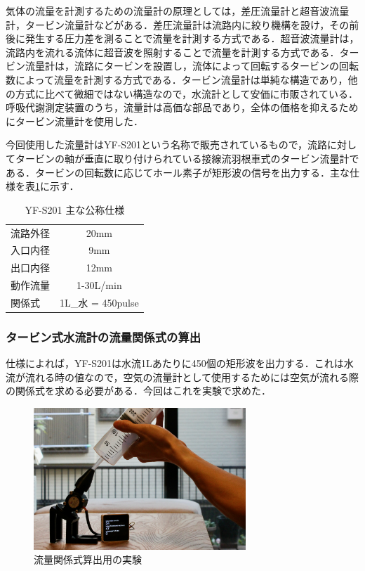 気体の流量を計測するための流量計の原理としては，差圧流量計と超音波流量計，タービン流量計などがある．差圧流量計は流路内に絞り機構を設け，その前後に発生する圧力差を測ることで流量を計測する方式である．超音波流量計は，流路内を流れる流体に超音波を照射することで流量を計測する方式である．タービン流量計は，流路にタービンを設置し，流体によって回転するタービンの回転数によって流量を計測する方式である．タービン流量計は単純な構造であり，他の方式に比べて微細ではない構造なので，水流計として安価に市販されている．呼吸代謝測定装置のうち，流量計は高価な部品であり，全体の価格を抑えるためにタービン流量計を使用した．

今回使用した流量計はYF-S201という名称で販売されているもので，流路に対してタービンの軸が垂直に取り付けられている接線流羽根車式のタービン流量計である．タービンの回転数に応じてホール素子が矩形波の信号を出力する．主な仕様を表\ref{tb:YFS201_specsheet}に示す．

\begin{table}[h]
  \begin{center}
  \caption{YF-S201 主な公称仕様}
  \label{tb:YFS201_specsheet}
    \begin{tabular}{lc}
      流路外径 & 20mm \\
      入口内径 & 9mm \\
      出口内径 & 12mm \\
      動作流量 & 1-30L/min \\
      関係式 & 1L_{水} = 450pulse
    \end{tabular}
  \end{center}
\end{table}

\subsubsection{タービン式水流計の流量関係式の算出}

仕様によれば，YF-S201は水流1Lあたりに450個の矩形波を出力する．これは水流が流れる時の値なので，空気の流量計として使用するためには空気が流れる際の関係式を求める必要がある．今回はこれを実験で求めた．

\begin{figure}[h]
  \begin{center}
    \includegraphics[width=8cm]{fig/flowsensor_calibrate.png}
    \caption{流量関係式算出用の実験}
    \label{fig:flowsensor_calibrate}
  \end{center}
\end{figure}

